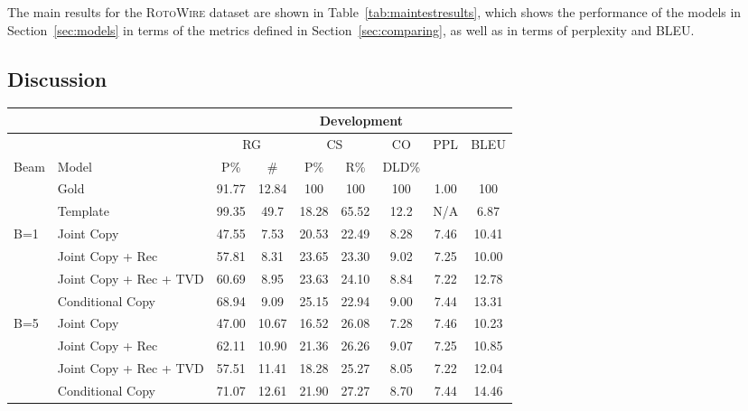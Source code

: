 \documentclass[11pt,letterpaper]{article}
\begin{document}
The main results for the \textsc{RotoWire} dataset are shown in Table~\ref{tab:maintestresults}, which shows the performance of the models in Section~\ref{sec:models} in terms of the metrics defined in Section~\ref{sec:comparing}, as well as in terms of perplexity and BLEU. 

\subsection{Discussion}
\begin{table*}
\small
\centering
\begin{tabular}{llccccccc}
\toprule
  & & \multicolumn{7}{c}{Development} \\
\midrule
& & \multicolumn{2}{c}{RG}  & \multicolumn{2}{c}{CS} & CO & PPL & BLEU\\
Beam & Model & P\% & \# & P\% & R\% & DLD\% &  & \\
\midrule
&Gold                 & 91.77 & 12.84 & 100   & 100   & 100  & 1.00 & 100 \\
&Template             & 99.35 & 49.7  & 18.28 & 65.52 & 12.2 & N/A  & 6.87   \\
\midrule
\multirow{ 4}{*}{B=1} & Joint Copy             & 47.55 & 7.53  & 20.53 & 22.49 & 8.28 & 7.46 & 10.41 \\

&Joint Copy + Rec  & 57.81 & 8.31  & 23.65 & 23.30 & 9.02 & 7.25 & 10.00 \\

&Joint Copy  + Rec + TVD  & 60.69 & 8.95 & 23.63 & 24.10 & 8.84 & 7.22 & 12.78 \\

&Conditional Copy       & 68.94 & 9.09  & 25.15 & 22.94 & 9.00 & 7.44 & 13.31 \\
\midrule
\multirow{ 4}{*}{B=5}  &Joint Copy             & 47.00 & 10.67 & 16.52 & 26.08 & 7.28 & 7.46 & 10.23 \\
&Joint Copy  + Rec  & 62.11 & 10.90 & 21.36 & 26.26 & 9.07 & 7.25 & 10.85 \\
&Joint Copy  + Rec + TVD  & 57.51 & 11.41 & 18.28 & 25.27 & 8.05 & 7.22 & 12.04 \\
&Conditional Copy        & 71.07 & 12.61 & 21.90 & 27.27 & 8.70 & 7.44 & 14.46 \\
\midrule


\end{tabular}
\end{table*}
\end{document}

